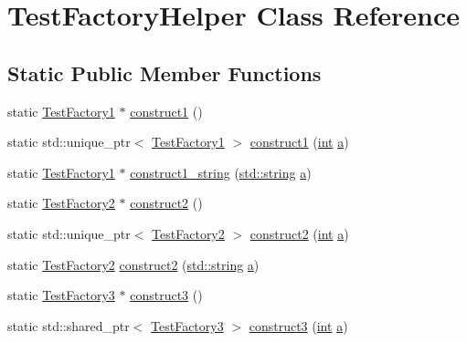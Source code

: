 \hypertarget{class_test_factory_helper}{}\section{Test\+Factory\+Helper Class Reference}
\label{class_test_factory_helper}
\subsection*{Static Public Member Functions}
\begin{DoxyCompactItemize}
\item 
static \mbox{\hyperlink{class_test_factory1}{Test\+Factory1}} $\ast$ \mbox{\hyperlink{class_test_factory_helper_a695fd935fdb494e024757800e0a7bb4a}{construct1}} ()
\item 
static std\+::unique\+\_\+ptr$<$ \mbox{\hyperlink{class_test_factory1}{Test\+Factory1}} $>$ \mbox{\hyperlink{class_test_factory_helper_a27e409628449f5c74d81e8939effab91}{construct1}} (\mbox{\hyperlink{warnings_8h_a74f207b5aa4ba51c3a2ad59b219a423b}{int}} \mbox{\hyperlink{_s_d_l__opengl__glext_8h_a3309789fc188587d666cda5ece79cf82}{a}})
\item 
static \mbox{\hyperlink{class_test_factory1}{Test\+Factory1}} $\ast$ \mbox{\hyperlink{class_test_factory_helper_a4b625ca89aff002a10788a4385bf7d9e}{construct1\+\_\+string}} (\mbox{\hyperlink{_s_d_l__opengl__glext_8h_ab4ccfaa8ab0e1afaae94dc96ef52dde1}{std\+::string}} \mbox{\hyperlink{_s_d_l__opengl__glext_8h_a3309789fc188587d666cda5ece79cf82}{a}})
\item 
static \mbox{\hyperlink{class_test_factory2}{Test\+Factory2}} $\ast$ \mbox{\hyperlink{class_test_factory_helper_a1cf2d51610df49466239de9a5bff13d2}{construct2}} ()
\item 
static std\+::unique\+\_\+ptr$<$ \mbox{\hyperlink{class_test_factory2}{Test\+Factory2}} $>$ \mbox{\hyperlink{class_test_factory_helper_a884d0975ae3186e48ab24be4e55fd775}{construct2}} (\mbox{\hyperlink{warnings_8h_a74f207b5aa4ba51c3a2ad59b219a423b}{int}} \mbox{\hyperlink{_s_d_l__opengl__glext_8h_a3309789fc188587d666cda5ece79cf82}{a}})
\item 
static \mbox{\hyperlink{class_test_factory2}{Test\+Factory2}} \mbox{\hyperlink{class_test_factory_helper_a4e3f8371835ae3517ca6ad7a7aff78b5}{construct2}} (\mbox{\hyperlink{_s_d_l__opengl__glext_8h_ab4ccfaa8ab0e1afaae94dc96ef52dde1}{std\+::string}} \mbox{\hyperlink{_s_d_l__opengl__glext_8h_a3309789fc188587d666cda5ece79cf82}{a}})
\item 
static \mbox{\hyperlink{class_test_factory3}{Test\+Factory3}} $\ast$ \mbox{\hyperlink{class_test_factory_helper_aa771c4cc605c1c3bb51c97913b15b3e6}{construct3}} ()
\item 
static std\+::shared\+\_\+ptr$<$ \mbox{\hyperlink{class_test_factory3}{Test\+Factory3}} $>$ \mbox{\hyperlink{class_test_factory_helper_aa5fd20141fdc7ddaed749200a0057b4f}{construct3}} (\mbox{\hyperlink{warnings_8h_a74f207b5aa4ba51c3a2ad59b219a423b}{int}} \mbox{\hyperlink{_s_d_l__opengl__glext_8h_a3309789fc188587d666cda5ece79cf82}{a}})
\end{DoxyCompactItemize}



